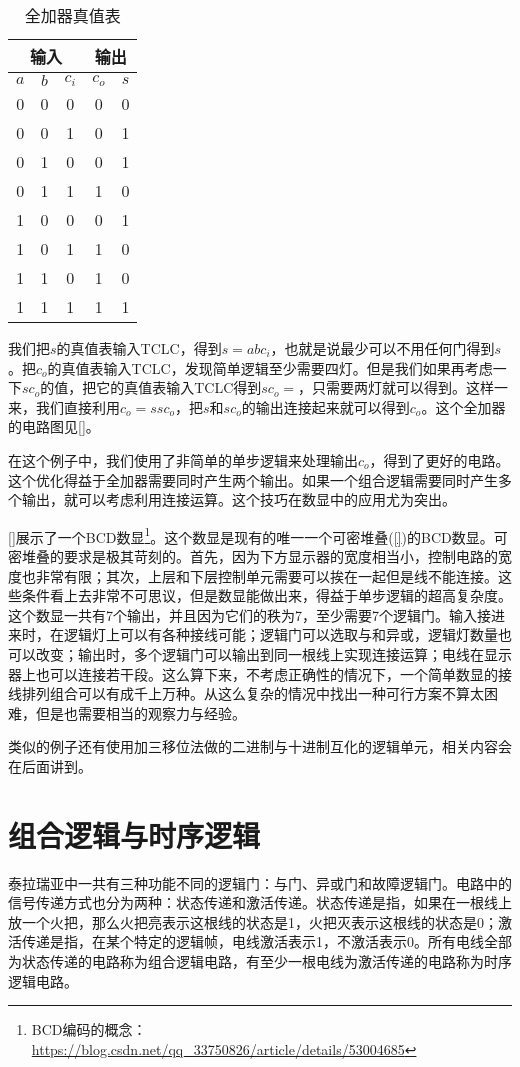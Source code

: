 \begin{table}[!h]
\centering
\begin{tabular}{c|c|c||c|c}
\multicolumn{3}{c||}{输入}&\multicolumn{2}{|c}{输出}\\
\hline
$a$&$b$&$c_i$&$c_o$&$s$\\
\hline
\hline
0&0&0&0&0\\
\hline
0&0&1&0&1\\
\hline
0&1&0&0&1\\
\hline
0&1&1&1&0\\
\hline
1&0&0&0&1\\
\hline
1&0&1&1&0\\
\hline
1&1&0&1&0\\
\hline
1&1&1&1&1
\end{tabular}
\caption{全加器真值表}
\label{tab9400}
\end{table}

我们把$s$的真值表输入TCLC，得到$s=abc_i$，也就是说最少可以不用任何门得到$s$。把$c_o$的真值表输入TCLC，发现简单逻辑至少需要四灯。但是我们如果再考虑一下$sc_o$的值，把它的真值表输入TCLC得到$sc_o=$，只需要两灯就可以得到。这样一来，我们直接利用$c_o=ssc_o$，把$s$和$sc_o$的输出连接起来就可以得到$c_o$。这个全加器的电路图见\autoref{}。

在这个例子中，我们使用了非简单的单步逻辑来处理输出$c_o$，得到了更好的电路。这个优化得益于全加器需要同时产生两个输出。如果一个组合逻辑需要同时产生多个输出，就可以考虑利用连接运算。这个技巧在数显中的应用尤为突出。

\autoref{}展示了一个BCD数显\footnote{BCD编码的概念：\url{https://blog.csdn.net/qq_33750826/article/details/53004685}}。这个数显是现有的唯一一个可密堆叠(\autoref{})的BCD数显。可密堆叠的要求是极其苛刻的。首先，因为下方显示器的宽度相当小，控制电路的宽度也非常有限；其次，上层和下层控制单元需要可以挨在一起但是线不能连接。这些条件看上去非常不可思议，但是数显能做出来，得益于单步逻辑的超高复杂度。这个数显一共有7个输出，并且因为它们的秩为7，至少需要7个逻辑门。输入接进来时，在逻辑灯上可以有各种接线可能；逻辑门可以选取与和异或，逻辑灯数量也可以改变；输出时，多个逻辑门可以输出到同一根线上实现连接运算；电线在显示器上也可以连接若干段。这么算下来，不考虑正确性的情况下，一个简单数显的接线排列组合可以有成千上万种。从这么复杂的情况中找出一种可行方案不算太困难，但是也需要相当的观察力与经验。

类似的例子还有使用加三移位法做的二进制与十进制互化的逻辑单元，相关内容会在后面讲到。

\section{组合逻辑与时序逻辑}
泰拉瑞亚中一共有三种功能不同的逻辑门：与门、异或门和故障逻辑门。电路中的信号传递方式也分为两种：状态传递和激活传递。状态传递是指，如果在一根线上放一个火把，那么火把亮表示这根线的状态是1，火把灭表示这根线的状态是0；激活传递是指，在某个特定的逻辑帧，电线激活表示1，不激活表示0。所有电线全部为状态传递的电路称为组合逻辑电路，有至少一根电线为激活传递的电路称为时序逻辑电路。

